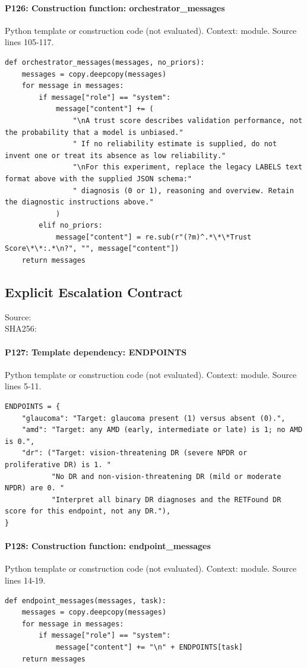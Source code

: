 \documentclass[10pt]{article}
\begin{document}
\paragraph{P126: Construction function: orchestrator\_messages}
Python template or construction code (not evaluated). Context: module. Source lines 105-117.
\begin{Verbatim}
def orchestrator_messages(messages, no_priors):
    messages = copy.deepcopy(messages)
    for message in messages:
        if message["role"] == "system":
            message["content"] += (
                "\nA trust score describes validation performance, not the probability that a model is unbiased."
                " If no reliability estimate is supplied, do not invent one or treat its absence as low reliability."
                "\nFor this experiment, replace the legacy LABELS text format above with the supplied JSON schema:"
                " diagnosis (0 or 1), reasoning and overview. Retain the diagnostic instructions above."
            )
        elif no_priors:
            message["content"] = re.sub(r"(?m)^.*\*\*Trust Score\*\*:.*\n?", "", message["content"])
    return messages
\end{Verbatim}
\subsection{Explicit Escalation Contract}
Source: \\
SHA256: {\scriptsize{}}
\paragraph{P127: Template dependency: ENDPOINTS}
Python template or construction code (not evaluated). Context: module. Source lines 5-11.
\begin{Verbatim}
ENDPOINTS = {
    "glaucoma": "Target: glaucoma present (1) versus absent (0).",
    "amd": "Target: any AMD (early, intermediate or late) is 1; no AMD is 0.",
    "dr": ("Target: vision-threatening DR (severe NPDR or proliferative DR) is 1. "
           "No DR and non-vision-threatening DR (mild or moderate NPDR) are 0. "
           "Interpret all binary DR diagnoses and the RETFound DR score for this endpoint, not any DR."),
}
\end{Verbatim}
\paragraph{P128: Construction function: endpoint\_messages}
Python template or construction code (not evaluated). Context: module. Source lines 14-19.
\begin{Verbatim}
def endpoint_messages(messages, task):
    messages = copy.deepcopy(messages)
    for message in messages:
        if message["role"] == "system":
            message["content"] += "\n" + ENDPOINTS[task]
    return messages
\end{Verbatim}
\end{document}

